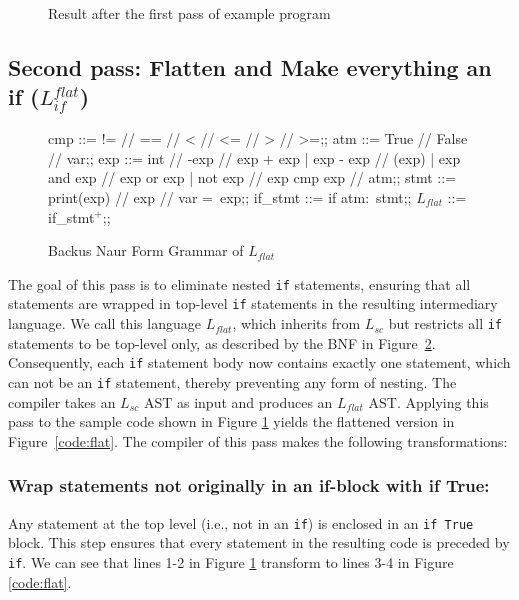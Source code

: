 \begin{figure}[h]
	\centering
	
	\caption{Result after the first pass of example program}
	\label{code:sc}
\end{figure}


\subsection{Second pass: Flatten and Make everything an if ($L_{if}^{flat}$)}
\begin{figure}[h!]
	\centering
	\begin{bnf}[row{-} = {bg = gray9}]
		cmp ::= != // == // < // <= // > // >=;;
		atm ::= True // False // var;;
		exp ::= int  // -exp // exp + exp 
		| exp - exp // (exp)
		| exp and exp // exp or exp 
		| not exp // exp cmp exp // atm;;
		stmt ::= print(exp) // exp // var = exp;;
		if\_stmt ::= if atm$\colon$ stmt;;
		$L_{flat}$ ::= if\_stmt$^+$;;
	\end{bnf}
	\caption{Backus Naur Form Grammar of $L_{flat}$}
	\label{bnf:flat}
\end{figure}

The goal of this pass is to eliminate nested \texttt{if} statements, ensuring that all statements are wrapped in top-level \texttt{if} statements in the resulting intermediary language. We call this language $L_{flat}$, which inherits from $L_{sc}$ but restricts all \texttt{if} statements to be top-level only, as described by the BNF in Figure~\ref{bnf:flat}. Consequently, each \texttt{if} statement body now contains exactly one statement, which can not be an \texttt{if} statement, thereby preventing any form of nesting. The compiler takes an $L_{sc}$ AST as input and produces an $L_{flat}$ AST. Applying this pass to the sample code shown in Figure \ref{code:sc} yields the flattened version in Figure~\ref{code:flat}. The compiler of this pass makes the following transformations:

\subsubsection{Wrap statements not originally in an if-block with if True:} Any statement at the top level (i.e., not in an \texttt{if}) is enclosed in an \texttt{if True} block. This step ensures that every statement in the resulting code is preceded by \texttt{if}. We can see that lines 1-2 in Figure \ref{code:sc} transform to lines 3-4 in Figure \ref{code:flat}.

